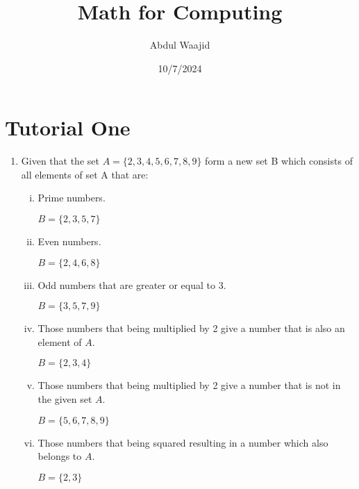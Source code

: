 \documentclass[]{article}
\title{Math for Computing}
\author{Abdul Waajid}
\date{10/7/2024}
\begin{document}
\maketitle

\section{Tutorial One}

\begin{enumerate}

    \item Given that the set $A = \{ 2, 3, 4, 5, 6, 7, 8, 9\}$ form a new set B which consists of all elements of set A that are: 
        
    \begin{enumerate}[i.]
        \item Prime numbers.

            $B = \{ 2, 3, 5, 7\}$

\vspace{0.3 cm}
        \item Even numbers.

            $B = \{ 2, 4, 6, 8\}$


\vspace{0.3 cm}
        \item Odd numbers that are greater or equal to 3.

            $B = \{ 3, 5, 7, 9\}$

\vspace{0.3 cm}
        \item Those numbers that being multiplied by 2 give a number that is also an element of $A$.
            
            $B = \{ 2, 3, 4 \}$


\vspace{0.3 cm}
        \item Those numbers that being multiplied by 2 give a number that is not in the given set $A$.

             $B = \{ 5, 6, 7, 8, 9 \}$

\vspace{0.3 cm}
        \item Those numbers that being squared resulting in a number which also belongs to $A$. 

             $B = \{ 2, 3 \}$
            
    \end{enumerate}
        

\end{enumerate}
\end{document}
